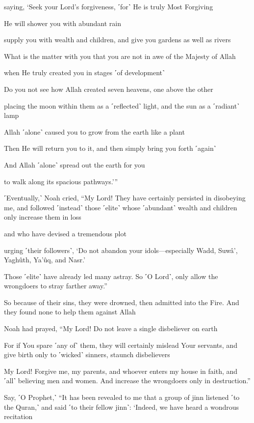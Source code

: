 saying, ‘Seek your Lord’s forgiveness, ˹for˺ He is truly Most Forgiving

He will shower you with abundant rain

supply you with wealth and children, and give you gardens as well as rivers

What is the matter with you that you are not in awe of the Majesty of Allah

when He truly created you in stages ˹of development˺

Do you not see how Allah created seven heavens, one above the other

placing the moon within them as a ˹reflected˺ light, and the sun as a ˹radiant˺ lamp

Allah ˹alone˺ caused you to grow from the earth like a plant

Then He will return you to it, and then simply bring you forth ˹again˺

And Allah ˹alone˺ spread out the earth for you

to walk along its spacious pathways.’”

˹Eventually,˺ Noah cried, “My Lord! They have certainly persisted in disobeying me, and followed ˹instead˺ those ˹elite˺ whose ˹abundant˺ wealth and children only increase them in loss

and who have devised a tremendous plot

urging ˹their followers˺, ‘Do not abandon your idols—especially Wadd, Suwâ’, Yaghûth, Ya’ûq, and Nasr.’

Those ˹elite˺ have already led many astray. So ˹O Lord˺, only allow the wrongdoers to stray farther away.”

So because of their sins, they were drowned, then admitted into the Fire. And they found none to help them against Allah

Noah had prayed, “My Lord! Do not leave a single disbeliever on earth

For if You spare ˹any of˺ them, they will certainly mislead Your servants, and give birth only to ˹wicked˺ sinners, staunch disbelievers

My Lord! Forgive me, my parents, and whoever enters my house in faith, and ˹all˺ believing men and women. And increase the wrongdoers only in destruction.”

Say, ˹O Prophet,˺ “It has been revealed to me that a group of jinn listened ˹to the Quran,˺ and said ˹to their fellow jinn˺: ‘Indeed, we have heard a wondrous recitation

